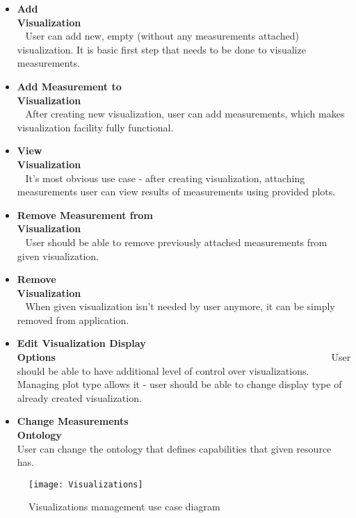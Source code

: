 \begin{itemize}

\item {\bf Add Visualization}~~~~~~~~~~~~~~~~~~~~~~~~~~~~~~~~~~~~~~~~~~~~~~~~~~~~~~~~\linebreak
User can add new, empty (without any measurements attached) visualization. It is basic first step that needs to be done to visualize measurements.

\item {\bf Add Measurement to Visualization}~~~~~~~~~~~~~~~~~~~~~~~~~~~~~~~~~~~~~~~~~~~~~~~~~~~~~~~~\linebreak
After creating new visualization, user can add measurements, which makes visualization facility fully functional.

\item {\bf View Visualization}~~~~~~~~~~~~~~~~~~~~~~~~~~~~~~~~~~~~~~~~~~~~~~~~~~~~~~~~\linebreak
It\rq{}s most obvious use case - after creating visualization, attaching measurements user can view results of measurements using provided plots.

\item {\bf Remove Measurement from Visualization}~~~~~~~~~~~~~~~~~~~~~~~~~~~~~~~~~~~~~~~~~~~~~~~~~~~~~~~~\linebreak
User should be able to remove previously attached measurements from given visualization.

\item {\bf Remove Visualization}~~~~~~~~~~~~~~~~~~~~~~~~~~~~~~~~~~~~~~~~~~~~~~~~~~~~~~~~\linebreak
When given visualization isn't needed by user anymore, it can be simply removed from application.

\item {\bf Edit Visualization Display Options}~~~~~~~~~~~~~~~~~~~~~~~~~~~~~~~~~~~~~~~~~~~~~~~~~~~~~~~~\linebreak
User should be able to have additional level of control over visualizations. Managing plot type allows it - user should be able to change display type of already created visualization.

\item {\bf Change Measurements Ontology}~~~~~~~~~~~~~~~~~~~~~~~~~~~~~~~~~~~~~~~~~~~~~~~~~~~~~~~~\linebreak
User can change the ontology that defines capabilities that given resource has.

\end{itemize}

\begin{figure}[ht]
\centering
\texttt{[image: Visualizations]}
\caption{Visualizations management use case diagram}
\label{fig:usecases_visualisations}
\end{figure}
